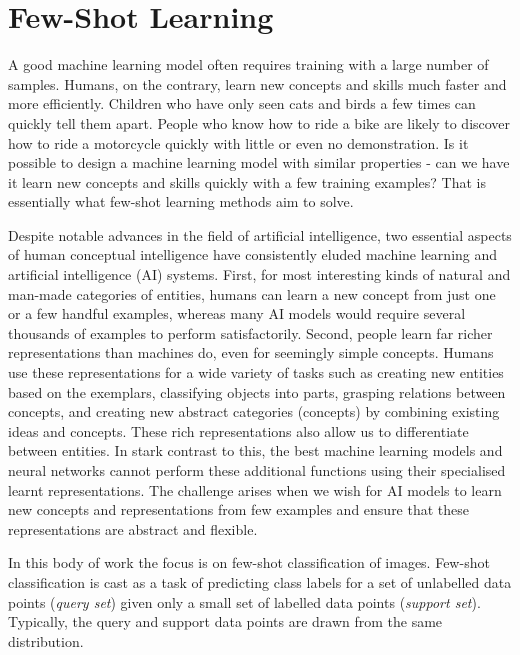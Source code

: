 \newcommand{\mcQ}{\mathcal{Q}}
\newcommand{\mcS}{\mathcal{S}}
\newcommand{\mcT}{\mathcal{T}}
\newcommand{\mcD}{\mathcal{D}}
\newcommand{\nwks}[2]{${#1}$-way, ${#2}$-shot}

\chapter{Few-Shot Learning}\label{chap:fsl}
A good machine learning model often requires training with a large number of samples. Humans, on the contrary, learn new concepts and skills much faster and more efficiently. Children who have only seen cats and birds a few times can quickly tell them apart. People who know how to ride a bike are likely to discover how to ride a motorcycle quickly with little or even no demonstration. Is it possible to design a machine learning model with similar properties - can we have it learn new concepts and skills quickly with a few training examples? That is essentially what few-shot learning methods aim to solve.

Despite notable advances in the field of artificial intelligence, two essential aspects of human conceptual intelligence have consistently eluded machine learning and artificial intelligence (AI) systems. 
First, for most interesting kinds of natural and man-made categories of entities, humans can learn a new concept from just one or a few handful examples, whereas many AI models would require several thousands of examples to perform satisfactorily. 
Second, people learn far richer representations than machines do, even for seemingly simple concepts. 
Humans use these representations for a wide variety of tasks such as creating new entities based on the exemplars, classifying objects into parts, grasping relations between concepts, and creating new abstract categories (concepts) by combining existing ideas and concepts. These rich representations also allow us to differentiate between entities.
In stark contrast to this, the best machine learning models and neural networks cannot perform these additional functions using their specialised learnt representations. 
The challenge arises when we wish for AI models to learn new concepts and representations from few examples and ensure that these representations are abstract and flexible.

In this body of work the focus is on few-shot classification of images. Few-shot classification is cast as a task of predicting class labels for a set of unlabelled data points (\textit{query set}) given only a small set of labelled data points (\textit{support set}). Typically, the query and support data points are drawn from the same distribution. 

